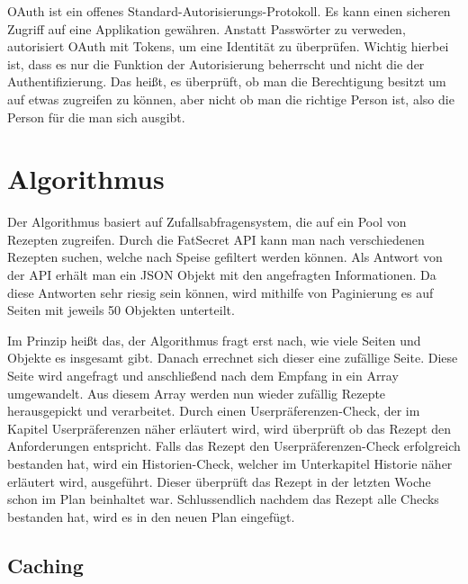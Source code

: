 OAuth\cite{OAuth} ist ein offenes Standard-Autorisierungs-Protokoll. Es kann einen sicheren Zugriff auf eine Applikation gewähren. Anstatt Passwörter zu verweden, autorisiert OAuth mit Tokens, um eine Identität zu überprüfen. Wichtig hierbei ist, dass es nur die Funktion der Autorisierung beherrscht und nicht die der Authentifizierung. Das heißt, es überprüft, ob man die Berechtigung besitzt um auf etwas zugreifen zu können, aber nicht ob man die richtige Person ist, also die Person für die man sich ausgibt.

\section{Algorithmus}

Der Algorithmus basiert auf Zufallsabfragensystem, die auf ein Pool von Rezepten zugreifen. Durch die FatSecret API kann man nach verschiedenen Rezepten suchen, welche nach Speise gefiltert werden können. Als Antwort von der API erhält man ein JSON Objekt mit den angefragten Informationen. Da diese Antworten sehr riesig sein können, wird mithilfe von Paginierung es auf Seiten mit jeweils 50 Objekten unterteilt. 

Im Prinzip heißt das, der Algorithmus fragt erst nach, wie viele Seiten und Objekte es insgesamt gibt. Danach errechnet sich dieser eine zufällige Seite. Diese Seite wird angefragt und anschließend nach dem Empfang in ein Array umgewandelt. Aus diesem Array werden nun wieder zufällig Rezepte herausgepickt und verarbeitet. Durch einen Userpräferenzen-Check, der im Kapitel Userpräferenzen näher erläutert wird, wird überprüft ob das Rezept den Anforderungen entspricht. Falls das Rezept den Userpräferenzen-Check erfolgreich bestanden hat, wird ein Historien-Check, welcher im Unterkapitel Historie näher erläutert wird, ausgeführt. Dieser überprüft das Rezept in der letzten Woche schon im Plan beinhaltet war. Schlussendlich nachdem das Rezept alle Checks bestanden hat, wird es in den neuen Plan eingefügt. 

\subsection{Caching}

